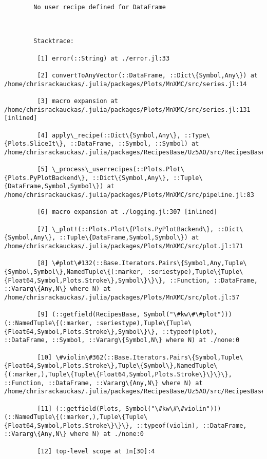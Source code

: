 \documentclass[11pt]{article}
\begin{document}
    \begin{Verbatim}[commandchars=\\\{\}]

        No user recipe defined for DataFrame

        

        Stacktrace:

         [1] error(::String) at ./error.jl:33

         [2] convertToAnyVector(::DataFrame, ::Dict\{Symbol,Any\}) at /home/chrisrackauckas/.julia/packages/Plots/MnXMC/src/series.jl:14

         [3] macro expansion at /home/chrisrackauckas/.julia/packages/Plots/MnXMC/src/series.jl:131 [inlined]

         [4] apply\_recipe(::Dict\{Symbol,Any\}, ::Type\{Plots.SliceIt\}, ::DataFrame, ::Symbol, ::Symbol) at /home/chrisrackauckas/.julia/packages/RecipesBase/Uz5AO/src/RecipesBase.jl:275

         [5] \_process\_userrecipes(::Plots.Plot\{Plots.PyPlotBackend\}, ::Dict\{Symbol,Any\}, ::Tuple\{DataFrame,Symbol,Symbol\}) at /home/chrisrackauckas/.julia/packages/Plots/MnXMC/src/pipeline.jl:83

         [6] macro expansion at ./logging.jl:307 [inlined]

         [7] \_plot!(::Plots.Plot\{Plots.PyPlotBackend\}, ::Dict\{Symbol,Any\}, ::Tuple\{DataFrame,Symbol,Symbol\}) at /home/chrisrackauckas/.julia/packages/Plots/MnXMC/src/plot.jl:171

         [8] \#plot\#132(::Base.Iterators.Pairs\{Symbol,Any,Tuple\{Symbol,Symbol\},NamedTuple\{(:marker, :seriestype),Tuple\{Tuple\{Float64,Symbol,Plots.Stroke\},Symbol\}\}\}, ::Function, ::DataFrame, ::Vararg\{Any,N\} where N) at /home/chrisrackauckas/.julia/packages/Plots/MnXMC/src/plot.jl:57

         [9] (::getfield(RecipesBase, Symbol("\#kw\#\#plot")))(::NamedTuple\{(:marker, :seriestype),Tuple\{Tuple\{Float64,Symbol,Plots.Stroke\},Symbol\}\}, ::typeof(plot), ::DataFrame, ::Symbol, ::Vararg\{Symbol,N\} where N) at ./none:0

         [10] \#violin\#362(::Base.Iterators.Pairs\{Symbol,Tuple\{Float64,Symbol,Plots.Stroke\},Tuple\{Symbol\},NamedTuple\{(:marker,),Tuple\{Tuple\{Float64,Symbol,Plots.Stroke\}\}\}\}, ::Function, ::DataFrame, ::Vararg\{Any,N\} where N) at /home/chrisrackauckas/.julia/packages/RecipesBase/Uz5AO/src/RecipesBase.jl:368

         [11] (::getfield(Plots, Symbol("\#kw\#\#violin")))(::NamedTuple\{(:marker,),Tuple\{Tuple\{Float64,Symbol,Plots.Stroke\}\}\}, ::typeof(violin), ::DataFrame, ::Vararg\{Any,N\} where N) at ./none:0

         [12] top-level scope at In[30]:4

    \end{Verbatim}
\end{document}
